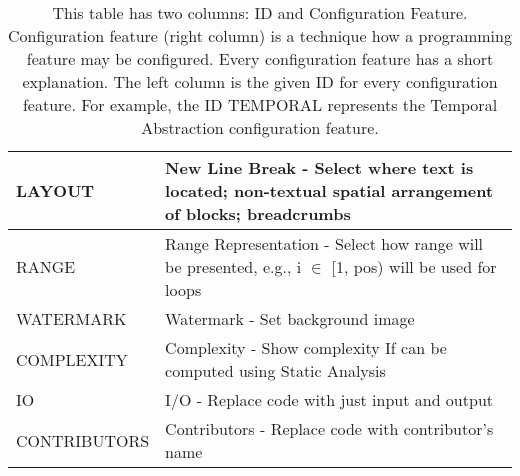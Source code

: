 \begin{table}[H]
\begin{tabular}{|l|p{14cm}|}
LAYOUT       & New Line Break - Select where text is located; non-textual spatial arrangement of blocks; breadcrumbs                              \\ \hline
RANGE        & Range Representation - Select how range will be presented, e.g., i $ \in $ {[}1, pos) will be used for loops                       \\ \hline
WATERMARK    & Watermark - Set background image                                                                                                   \\ \hline
COMPLEXITY   & Complexity - Show complexity If can be computed using Static Analysis                                                              \\ \hline
IO           & I/O - Replace code with just input and output                                                                                      \\ \hline
CONTRIBUTORS & Contributors - Replace code with contributor's name                                                                                \\ \hline
\end{tabular}
\caption{This table has two columns: ID and Configuration Feature. Configuration feature (right column) is a technique how a programming feature may be configured. Every configuration feature has a short explanation. The left column is the given ID for every configuration  feature. For example, the ID TEMPORAL represents the Temporal Abstraction configuration feature.}
\label{tab14}
\end{table}
